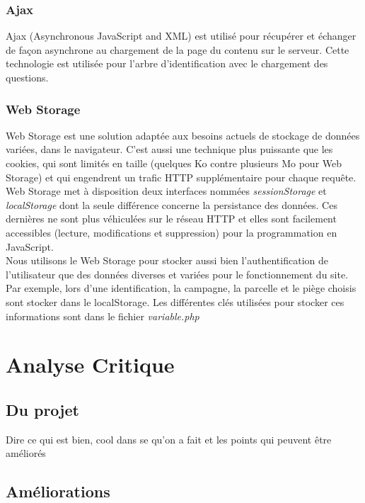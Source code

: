 \documentclass[twoside]{EPURapport}
\begin{document}
		\subsection{Ajax}
		\label{tec:ajax}
		Ajax (Asynchronous JavaScript and XML) est utilisé pour récupérer et échanger de façon asynchrone au chargement de la page du contenu sur le serveur. Cette technologie est utilisée pour l'arbre d'identification avec le chargement des questions.
		
		\subsection{Web Storage}
		\label{tec:storage}
		Web Storage est une solution adaptée aux besoins actuels de stockage de données variées, dans le navigateur. C'est aussi une technique plus puissante que les cookies, qui sont limités en taille (quelques Ko contre plusieurs Mo pour Web Storage) et qui engendrent un trafic HTTP supplémentaire pour chaque requête.\\
		
		Web Storage met à disposition deux interfaces nommées \emph{sessionStorage} et \emph{localStorage} dont la seule différence concerne la persistance des données. Ces dernières ne sont plus véhiculées sur le réseau HTTP et elles sont facilement accessibles (lecture, modifications et suppression) pour la programmation en JavaScript.\\
		
		Nous utilisons le Web Storage pour stocker aussi bien l'authentification de l'utilisateur que des données diverses et variées pour le fonctionnement du site. Par exemple, lors d'une identification, la campagne, la parcelle et le piège choisis sont stocker dans le localStorage. Les différentes clés utilisées pour stocker ces informations sont dans le fichier \emph{variable.php}

\chapter{Analyse Critique}

	\section{Du projet}
	
	Dire ce qui est bien, cool dans se qu'on a fait et les points qui peuvent être améliorés
	
	\section{Améliorations}
	
\end{document}
